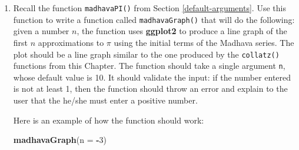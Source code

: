\documentclass[]{book}
\makeatletter
\newenvironment{Shaded}{\begin{snugshade}}{\end{snugshade}}
\newcommand{\KeywordTok}[1]{\textcolor[rgb]{0.13,0.29,0.53}{\textbf{#1}}}
\newcommand{\DataTypeTok}[1]{\textcolor[rgb]{0.13,0.29,0.53}{#1}}
\newcommand{\DecValTok}[1]{\textcolor[rgb]{0.00,0.00,0.81}{#1}}
\newcommand{\OperatorTok}[1]{\textcolor[rgb]{0.81,0.36,0.00}{\textbf{#1}}}
\newcommand{\NormalTok}[1]{#1}
\newenvironment{kframe}{%
\medskip{}
\setlength{\fboxsep}{.8em}
 \def\at@end@of@kframe{}%
 \ifinner\ifhmode%
  \def\at@end@of@kframe{\end{minipage}}%
  \begin{minipage}{\columnwidth}%
 \fi\fi%
 \def\FrameCommand##1{\hskip\@totalleftmargin \hskip-\fboxsep
 \colorbox{shadecolor}{##1}\hskip-\fboxsep
     \hskip-\linewidth \hskip-\@totalleftmargin \hskip\columnwidth}%
 \MakeFramed {\advance\hsize-\width
   \@totalleftmargin\z@ \linewidth\hsize
   \@setminipage}}%
 {\par\unskip\endMakeFramed%
 \at@end@of@kframe}
\renewenvironment{Shaded}{\begin{kframe}}{\end{kframe}}
\theoremstyle{definition}
\theoremstyle{definition}
\theoremstyle{definition}
\theoremstyle{remark}
\makeatother
\begin{document}
{\begin{enumerate}
  \begin{quote}
  98 bottles of beer on the wall,
  \end{quote}

  \begin{quote}
  98 bottles of beer!
  \end{quote}

  \begin{quote}
  Take one down and pass it around:
  \end{quote}

  \begin{quote}
  \ldots{}
  \end{quote}

  \begin{quote}
  1 bottle of beer on the wall.
  \end{quote}

  \begin{quote}
  1 bottle of beer!
  \end{quote}

  \begin{quote}
  Take it down and pass it around:
  \end{quote}

  \begin{quote}
  No more bottles of beer on the wall.
  \end{quote}

  Make sure to get the lyrics exactly right. For example, it's ``1
  bottle'', not ``1 bottles''.
\item
  Recall the function \texttt{madhavaPI()} from Section
  \ref{default-arguments}. Use this function to write a function called
  \texttt{madhavaGraph()} that will do the following: given a number
  \(n\), the function uses \textbf{ggplot2} to produce a line graph of
  the first \(n\) approximations to \(\pi\) using the initial terms of
  the Madhava series. The plot should be a line graph similar to the one
  produced by the \texttt{collatz()} functions from this Chapter. The
  function should take a single argument \texttt{n}, whose default value
  is 10. It should validate the input: if the number entered is not at
  least 1, then the function should throw an error and explain to the
  user that the he/she must enter a positive number.

  Here is an example of how the function should work:

\begin{Shaded}
\begin{Highlighting}[]
\KeywordTok{madhavaGraph}\NormalTok{(}\DataTypeTok{n =} \OperatorTok{-}\DecValTok{3}\NormalTok{)}
\end{Highlighting}
\end{Shaded}


\end{enumerate}}
\end{document}
